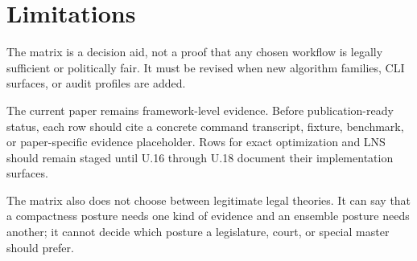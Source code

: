\section{Limitations}

The matrix is a decision aid, not a proof that any chosen workflow is legally
sufficient or politically fair. It must be revised when new algorithm families,
CLI surfaces, or audit profiles are added.

The current paper remains framework-level evidence. Before publication-ready status,
each row should cite a concrete command transcript, fixture, benchmark, or
paper-specific evidence placeholder. Rows for exact optimization and LNS should
remain staged until U.16 through U.18 document their implementation surfaces.

The matrix also does not choose between legitimate legal theories. It can say
that a compactness posture needs one kind of evidence and an ensemble posture
needs another; it cannot decide which posture a legislature, court, or special
master should prefer.
